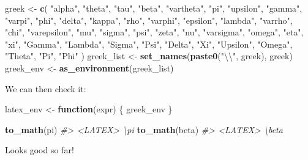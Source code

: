 \documentclass[]{book}
\newenvironment{Shaded}{\begin{snugshade}}{\end{snugshade}}
\newcommand{\CharTok}[1]{\textcolor[rgb]{0.5,0.5,0.5}{#1}}
\newcommand{\CommentTok}[1]{\textcolor[rgb]{0.37,0.37,0.37}{\textit{#1}}}
\newcommand{\ControlFlowTok}[1]{\textcolor[rgb]{0.27,0.27,0.27}{\textbf{#1}}}
\newcommand{\KeywordTok}[1]{\textcolor[rgb]{0.27,0.27,0.27}{\textbf{#1}}}
\newcommand{\NormalTok}[1]{#1}
\newcommand{\StringTok}[1]{\textcolor[rgb]{0.5,0.5,0.5}{#1}}
\begin{document}
\begin{Shaded}
\begin{Highlighting}[]
\NormalTok{greek <-}\StringTok{ }\KeywordTok{c}\NormalTok{(}
  \StringTok{"alpha"}\NormalTok{, }\StringTok{"theta"}\NormalTok{, }\StringTok{"tau"}\NormalTok{, }\StringTok{"beta"}\NormalTok{, }\StringTok{"vartheta"}\NormalTok{, }\StringTok{"pi"}\NormalTok{, }\StringTok{"upsilon"}\NormalTok{,}
  \StringTok{"gamma"}\NormalTok{, }\StringTok{"varpi"}\NormalTok{, }\StringTok{"phi"}\NormalTok{, }\StringTok{"delta"}\NormalTok{, }\StringTok{"kappa"}\NormalTok{, }\StringTok{"rho"}\NormalTok{,}
  \StringTok{"varphi"}\NormalTok{, }\StringTok{"epsilon"}\NormalTok{, }\StringTok{"lambda"}\NormalTok{, }\StringTok{"varrho"}\NormalTok{, }\StringTok{"chi"}\NormalTok{, }\StringTok{"varepsilon"}\NormalTok{,}
  \StringTok{"mu"}\NormalTok{, }\StringTok{"sigma"}\NormalTok{, }\StringTok{"psi"}\NormalTok{, }\StringTok{"zeta"}\NormalTok{, }\StringTok{"nu"}\NormalTok{, }\StringTok{"varsigma"}\NormalTok{, }\StringTok{"omega"}\NormalTok{, }\StringTok{"eta"}\NormalTok{,}
  \StringTok{"xi"}\NormalTok{, }\StringTok{"Gamma"}\NormalTok{, }\StringTok{"Lambda"}\NormalTok{, }\StringTok{"Sigma"}\NormalTok{, }\StringTok{"Psi"}\NormalTok{, }\StringTok{"Delta"}\NormalTok{, }\StringTok{"Xi"}\NormalTok{,}
  \StringTok{"Upsilon"}\NormalTok{, }\StringTok{"Omega"}\NormalTok{, }\StringTok{"Theta"}\NormalTok{, }\StringTok{"Pi"}\NormalTok{, }\StringTok{"Phi"}
\NormalTok{)}
\NormalTok{greek_list <-}\StringTok{ }\KeywordTok{set_names}\NormalTok{(}\KeywordTok{paste0}\NormalTok{(}\StringTok{"}\CharTok{\textbackslash{}\textbackslash{}}\StringTok{"}\NormalTok{, greek), greek)}
\NormalTok{greek_env <-}\StringTok{ }\KeywordTok{as_environment}\NormalTok{(greek_list)}
\end{Highlighting}
\end{Shaded}

We can then check it:

\begin{Shaded}
\begin{Highlighting}[]
\NormalTok{latex_env <-}\StringTok{ }\ControlFlowTok{function}\NormalTok{(expr) \{}
\NormalTok{  greek_env}
\NormalTok{\}}

\KeywordTok{to_math}\NormalTok{(pi)}
\CommentTok{#> <LATEX> \textbackslash{}pi}
\KeywordTok{to_math}\NormalTok{(beta)}
\CommentTok{#> <LATEX> \textbackslash{}beta}
\end{Highlighting}
\end{Shaded}

Looks good so far!
\end{document}
